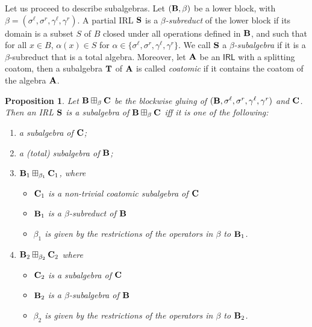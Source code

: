 \documentclass{amsart}
\newtheorem{proposition}[theorem]{Proposition}
\theoremstyle{definition}
\numberwithin{equation}{section}
\newcommand{\alg}[1]{{\textbf{\upshape #1}}}  %
\newcommand{\vv}[1]{\mathsf {#1}}
\newcommand{\sell}{\sigma^\ell}
\newcommand{\sr}{\sigma^r}
\newcommand{\gell}{\gamma^\ell}
\newcommand{\gr}{\gamma^r}
\begin{document}
Let us proceed to describe subalgebras. 
Let $(\alg B, \beta)$ be a lower block, with $\beta = (\sell, \sr, \gell, \gr)$.
A partial IRL $\alg S$ is a {\em $\beta$-subreduct} of the lower block if its domain is a subset $S$ of $B$ closed under all operations defined in $\alg B$, and such that for all $x \in B$, $\alpha(x) \in S$ for $\alpha \in \{ \sell, \sr, \gell, \gr\}$. We call $\alg S$ a {\em $\beta$-subalgebra} if it is a $\beta$-subreduct that is a total algebra. Moreover, let $\alg A$ be an $\vv{IRL}$ with a splitting coatom, then a subalgebra $\alg T$ of $\alg A$ is called {\em coatomic} if it contains the coatom of the algebra $\alg A$. 
\begin{proposition}
	Let $\alg B \boxplus_\beta \alg C$ be the blockwise gluing of $(\alg B, \sell, \sr, \gell, \gr)$ and $\alg C$. Then an IRL $\alg S$ is a subalgebra of $\alg B \boxplus_\beta \alg C$ iff it is one of the following: 
	\begin{enumerate}
		\item a subalgebra of $\alg C$;
		\item a (total) subalgebra of $\alg B$;
	    \item $\alg B_1 \boxplus_{\beta_1} \alg C_1$, where
		\begin{itemize}
			\item $\alg C_1$ is a non-trivial coatomic subalgebra of $\alg C$
			\item $\alg B_1$ is a $\beta$-subreduct of $\alg B$
			\item $\beta_1$ is given by the restrictions of the operators in $\beta$ to $\alg B_1$.
		\end{itemize}
		\item $\alg B_2 \boxplus_{\beta_2} \alg C_2$ where
		\begin{itemize}
			\item $\alg C_2$ is a subalgebra of $\alg C$
			\item $\alg B_2$ is a $\beta$-subalgebra of $\alg B$
			\item $\beta_2$ is given by the restrictions of the operators in $\beta$ to $\alg B_2$.
		\end{itemize}
	\end{enumerate}
\end{proposition}
\end{document}
